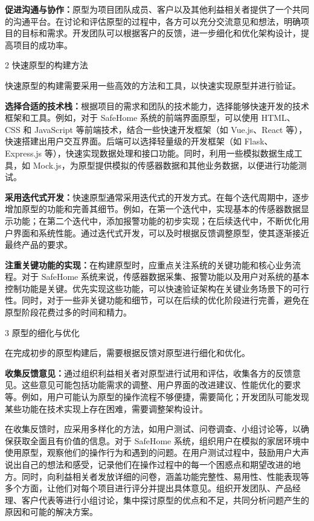 \textbf{促进沟通与协作：}原型为项目团队成员、客户以及其他利益相关者提供了一个共同的沟通平台。在讨论和评估原型的过程中，各方可以充分交流意见和想法，明确项目的目标和需求。开发团队可以根据客户的反馈，进一步细化和优化架构设计，提高项目的成功率。

2 快速原型的构建方法

快速原型的构建需要采用一些高效的方法和工具，以快速实现原型并进行验证。

\textbf{选择合适的技术栈：}根据项目的需求和团队的技术能力，选择能够快速开发的技术框架和工具。例如，对于 SafeHome 系统的前端界面原型，可以使用 HTML、CSS 和 JavaScript 等前端技术，结合一些快速开发框架（如 Vue.js、React 等），快速搭建出用户交互界面。后端可以选择轻量级的开发框架（如 Flask、Express.js 等），快速实现数据处理和接口功能。同时，利用一些模拟数据生成工具，如 Mock.js，为原型提供模拟的传感器数据和其他业务数据，以便进行功能测试。

\textbf{采用迭代式开发：}快速原型通常采用迭代式的开发方式。在每个迭代周期中，逐步增加原型的功能和完善其细节。例如，在第一个迭代中，实现基本的传感器数据显示功能；在第二个迭代中，添加报警功能的初步实现；在后续迭代中，不断优化用户界面和系统性能。通过迭代式开发，可以及时根据反馈调整原型，使其逐渐接近最终产品的要求。

\textbf{注重关键功能的实现：}在构建原型时，应重点关注系统的关键功能和核心业务流程。对于 SafeHome 系统来说，传感器数据采集、报警功能以及用户对系统的基本控制功能是关键。优先实现这些功能，可以快速验证架构在关键业务场景下的可行性。同时，对于一些非关键功能和细节，可以在后续的优化阶段进行完善，避免在原型阶段花费过多的时间和精力。

3 原型的细化与优化

在完成初步的原型构建后，需要根据反馈对原型进行细化和优化。

\textbf{收集反馈意见：}通过组织利益相关者对原型进行试用和评估，收集各方的反馈意见。这些意见可能包括功能需求的调整、用户界面的改进建议、性能优化的要求等。例如，用户可能认为原型的操作流程不够便捷，需要简化；开发团队可能发现某些功能在技术实现上存在困难，需要调整架构设计。

在收集反馈时，应采用多样化的方法，如用户测试、问卷调查、小组讨论等，以确保获取全面且有价值的信息。对于 SafeHome 系统，组织用户在模拟的家居环境中使用原型，观察他们的操作行为和遇到的问题。在用户测试过程中，鼓励用户大声说出自己的想法和感受，记录他们在操作过程中的每一个困惑点和期望改进的地方。同时，向利益相关者发放详细的问卷，涵盖功能完整性、易用性、性能表现等多个方面，让他们对每个项目进行评分并提出具体意见。组织开发团队、产品经理、客户代表等进行小组讨论，集中探讨原型的优点和不足，共同分析问题产生的原因和可能的解决方案。

